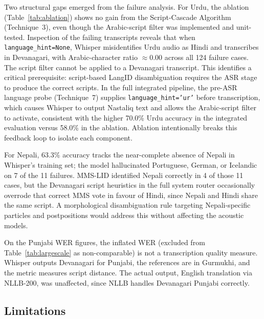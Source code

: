 \documentclass[conference]{IEEEtran}
\begin{document}
Two structural gaps emerged from the failure analysis. For Urdu, the ablation (Table~\ref{tab:ablation}) shows no gain from the Script-Cascade Algorithm (Technique~3), even though the Arabic-script filter was implemented and unit-tested. Inspection of the failing transcripts reveals that when \texttt{language\_hint=None}, Whisper misidentifies Urdu audio as Hindi and transcribes in Devanagari, with Arabic-character ratio $\approx 0.00$ across all 124 failure cases. The script filter cannot be applied to a Devanagari transcript. This identifies a critical prerequisite: script-based LangID disambiguation requires the ASR stage to produce the correct scripts. In the full integrated pipeline, the pre-ASR language probe (Technique~7) supplies \texttt{language\_hint='ur'} before transcription, which causes Whisper to output Nastaliq text and allows the Arabic-script filter to activate, consistent with the higher 70.0\% Urdu accuracy in the integrated evaluation versus 58.0\% in the ablation. Ablation intentionally breaks this feedback loop to isolate each component.

For Nepali, 63.3\% accuracy tracks the near-complete absence of Nepali in Whisper's training set; the model hallucinated Portuguese, German, or Icelandic on 7 of the 11 failures. MMS-LID identified Nepali correctly in 4 of those 11 cases, but the Devanagari script heuristics in the full system router occasionally overrode that correct MMS vote in favour of Hindi, since Nepali and Hindi share the same script. A morphological disambiguation rule targeting Nepali-specific particles and postpositions would address this without affecting the acoustic models.

On the Punjabi WER figures, the inflated WER (excluded from Table~\ref{tab:largescale} as non-comparable) is not a transcription quality measure. Whisper outputs Devanagari for Punjabi, the references are in Gurmukhi, and the metric measures script distance. The actual output, English translation via NLLB-200, was unaffected, since NLLB handles Devanagari Punjabi correctly.

\subsection{Limitations}
\end{document}
